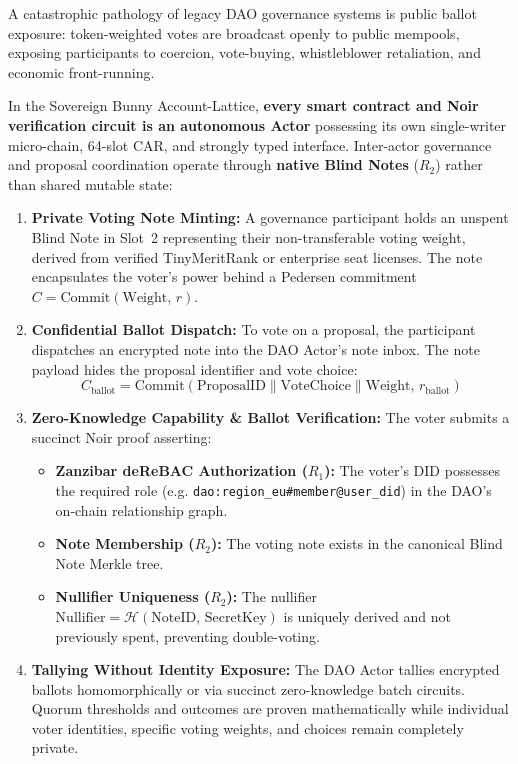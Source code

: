 \documentclass[a4paper,11pt,twoside,parskip=half-,headings=small]{scrartcl}
\newcommand{\code}[1]{\texttt{#1}}
\begin{document}
A catastrophic pathology of legacy DAO governance systems is public ballot exposure: token-weighted
votes are broadcast openly to public mempools, exposing participants to coercion, vote-buying,
whistleblower retaliation, and economic front-running.

In the Sovereign Bunny Account-Lattice, \textbf{every smart contract and Noir verification circuit is an autonomous Actor}
possessing its own single-writer micro-chain, 64-slot CAR, and strongly typed interface.
Inter-actor governance and proposal coordination operate through \textbf{native Blind Notes} ($R_2$)
rather than shared mutable state:
\begin{enumerate}
  \item \textbf{Private Voting Note Minting:} A governance participant holds an unspent Blind Note in Slot~2
representing their non-transferable voting weight, derived from verified TinyMeritRank or enterprise seat licenses.
The note encapsulates the voter's power behind a Pedersen commitment $C = \text{Commit}(\text{Weight},\, r)$.
  \item \textbf{Confidential Ballot Dispatch:} To vote on a proposal, the participant dispatches an encrypted note
into the DAO Actor's note inbox. The note payload hides the proposal identifier and vote choice:
  \begin{equation}
    C_{\text{ballot}} = \text{Commit}(\text{ProposalID} \parallel \text{VoteChoice} \parallel \text{Weight},\, r_{\text{ballot}})
  \end{equation}
  \item \textbf{Zero-Knowledge Capability \& Ballot Verification:} The voter submits a succinct Noir proof asserting:
  \begin{itemize}
    \item \textbf{Zanzibar deReBAC Authorization ($R_1$):} The voter's DID possesses the required role (e.g. \code{dao:region\_eu\#member@user\_did}) in the DAO's on-chain relationship graph.
    \item \textbf{Note Membership ($R_2$):} The voting note exists in the canonical Blind Note Merkle tree.
    \item \textbf{Nullifier Uniqueness ($R_2$):} The nullifier $\text{Nullifier} = \mathcal{H}(\text{NoteID},\, \text{SecretKey})$ is uniquely derived and not previously spent, preventing double-voting.
  \end{itemize}
  \item \textbf{Tallying Without Identity Exposure:} The DAO Actor tallies encrypted ballots homomorphically or via
succinct zero-knowledge batch circuits. Quorum thresholds and outcomes are proven mathematically while
individual voter identities, specific voting weights, and choices remain completely private.
\end{enumerate}
\end{document}
